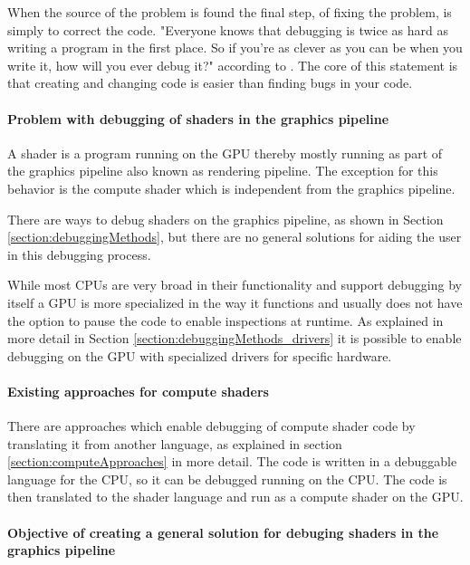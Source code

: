 When the source of the problem is found the final step, of fixing the problem, is simply to correct the code. "Everyone knows that debugging is twice as hard as writing a program in the first place. So if you're as clever as you can be when you write it, how will you ever debug it?" according to . The core of this statement is that creating and changing code is easier than finding bugs in your code.

\paragraph{Problem with debugging of shaders in the graphics pipeline}

A shader is a program running on the GPU thereby mostly running as part of the graphics pipeline also known as rendering pipeline. The exception for this behavior is the compute shader which is independent from the graphics pipeline.

There are ways to debug shaders on the graphics pipeline, as shown in Section \ref{section:debuggingMethods}, but there are no general solutions for aiding the user in this debugging process.

While most CPUs are very broad in their functionality and support debugging by itself a GPU is more specialized in the way it functions and usually does not have the option to pause the code to enable inspections at runtime. As explained in more detail in Section \ref{section:debuggingMethods_drivers} it is possible to enable debugging on the GPU with specialized drivers for specific hardware.

\paragraph{Existing approaches for compute shaders}

There are approaches which enable debugging of compute shader code by translating it from another language, as explained in section \ref{section:computeApproaches} in more detail. The code is written in a debuggable language for the CPU, so it can be debugged running on the CPU. The code is then translated to the shader language and run as a compute shader on the GPU.

\paragraph{Objective of creating a general solution for debuging shaders in the graphics pipeline}

